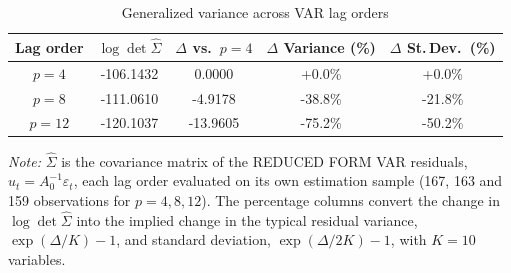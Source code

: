 \begin{table}[htpb]
    \centering
    \renewcommand{\arraystretch}{1.2}
    \caption{Generalized variance across VAR lag orders}
    \label{tab:generalized_variance}
    \begin{tabular}{ccccc}
    \toprule
    \textbf{Lag order} & \textbf{$\log\det\hat{\Sigma}$} & \textbf{$\Delta$ vs.\ $p=4$} & \textbf{$\Delta$ Variance (\%)} & \textbf{$\Delta$ St.\,Dev.\ (\%)} \\
    \midrule
    $p = 4$ & -106.1432 & 0.0000 & +0.0\% & +0.0\% \\
    $p = 8$ & -111.0610 & -4.9178 & -38.8\% & -21.8\% \\
    $p = 12$ & -120.1037 & -13.9605 & -75.2\% & -50.2\% \\
    \bottomrule
    \end{tabular}

    \vspace{0.2cm}
    \raggedright
    \scriptsize{\textit{Note:} $\hat{\Sigma}$ is the covariance matrix of the REDUCED FORM VAR residuals, $u_t = A_0^{-1}\varepsilon_t$, each lag order evaluated on its own estimation sample (167, 163 and 159 observations for $p=4,8,12$). The percentage columns convert the change in $\log\det\hat{\Sigma}$ into the implied change in the typical residual variance, $\exp(\Delta/K)-1$, and standard deviation, $\exp(\Delta/2K)-1$, with $K=10$ variables.}
\end{table}
